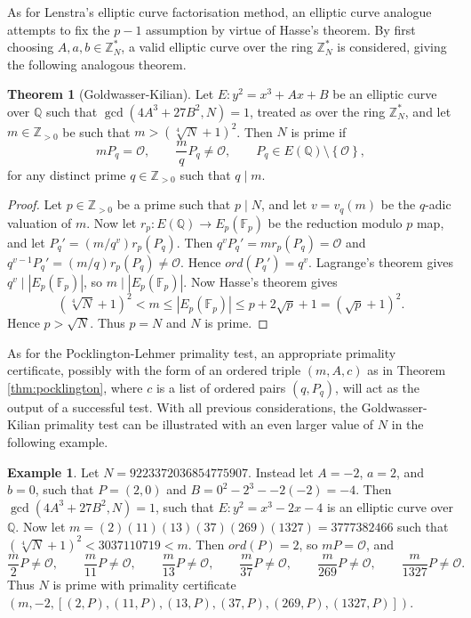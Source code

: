 \documentclass{article}
\newcommand{\F}{\mathbb{F}}
\newcommand{\Z}{\mathbb{Z}}
\newcommand{\Q}{\mathbb{Q}}
\newcommand{\rb}[1]{\left( #1 \right)}
\renewcommand{\sb}[1]{\left[ #1 \right]}
\newcommand{\cb}[1]{\left\{ #1 \right\}}
\newcommand{\abs}[1]{\left\lvert #1 \right\rvert}
\theoremstyle{definition}
\newtheorem*{example}{Example}
\newtheorem{theorem}[proposition]{Theorem}
\begin{document}
As for Lenstra's elliptic curve factorisation method, an elliptic curve analogue attempts to fix the $ p - 1 $ assumption by virtue of Hasse's theorem. By first choosing $ A, a, b \in \Z_N^* $, a valid elliptic curve over the ring $ \Z_N^* $ is considered, giving the following analogous theorem.

\begin{theorem}[Goldwasser-Kilian]
Let $ E : y^2 = x^3 + Ax + B $ be an elliptic curve over $ \Q $ such that $ \gcd\rb{4A^3 + 27B^2, N} = 1 $, treated as over the ring $ \Z_N^* $, and let $ m \in \Z_{> 0} $ be such that $ m > \rb{\sqrt[4]{N} + 1}^2 $. Then $ N $ is prime if
$$ mP_q = \mathcal{O}, \qquad \dfrac{m}{q}P_q \ne \mathcal{O}, \qquad P_q \in E\rb{\Q} \setminus \cb{\mathcal{O}}, $$
for any distinct prime $ q \in \Z_{> 0} $ such that $ q \mid m $.
\end{theorem}

\begin{proof}
Let $ p \in \Z_{> 0} $ be a prime such that $ p \mid N $, and let $ v = v_q\rb{m} $ be the $ q $-adic valuation of $ m $. Now let $ r_p : E\rb{\Q} \to E_p\rb{\F_p} $ be the reduction modulo $ p $ map, and let $ P_q' = \rb{m / q^v}r_p\rb{P_q} $. Then $ q^vP_q' = mr_p\rb{P_q} = \mathcal{O} $ and $ q^{v - 1}P_q' = \rb{m / q}r_p\rb{P_q} \ne \mathcal{O} $. Hence $ ord\rb{P_q'} = q^v $. Lagrange's theorem gives $ q^v \mid \abs{E_p\rb{\F_p}} $, so $ m \mid \abs{E_p\rb{\F_p}} $. Now Hasse's theorem gives
$$ \rb{\sqrt[4]{N} + 1}^2 < m \le \abs{E_p\rb{\F_p}} \le p + 2\sqrt{p} + 1 = \rb{\sqrt{p} + 1}^2. $$
Hence $ p > \sqrt{N} $. Thus $ p = N $ and $ N $ is prime.
\end{proof}

As for the Pocklington-Lehmer primality test, an appropriate primality certificate, possibly with the form of an ordered triple $ \rb{m, A, c} $ as in Theorem \ref{thm:pocklington}, where $ c $ is a list of ordered pairs $ \rb{q, P_q} $, will act as the output of a successful test. With all previous considerations, the Goldwasser-Kilian primality test can be illustrated with an even larger value of $ N $ in the following example.

\begin{example}
Let $ N = 9223372036854775907 $. Instead let $ A = -2 $, $ a = 2 $, and $ b = 0 $, such that $ P = \rb{2, 0} $ and $ B = 0^2 - 2^3 - -2\rb{-2} = -4 $. Then $ \gcd\rb{4A^3 + 27B^2, N} = 1 $, such that $ E : y^2 = x^3 - 2x - 4 $ is an elliptic curve over $ \Q $. Now let $ m = \rb{2}\rb{11}\rb{13}\rb{37}\rb{269}\rb{1327} = 3777382466 $ such that $ \rb{\sqrt[4]{N} + 1}^2 < 3037110719 < m $. Then $ ord\rb{P} = 2 $, so $ mP = \mathcal{O} $, and
$$ \dfrac{m}{2}P \ne \mathcal{O}, \qquad \dfrac{m}{11}P \ne \mathcal{O}, \qquad \dfrac{m}{13}P \ne \mathcal{O}, \qquad \dfrac{m}{37}P \ne \mathcal{O}, \qquad \dfrac{m}{269}P \ne \mathcal{O}, \qquad \dfrac{m}{1327}P \ne \mathcal{O}. $$
Thus $ N $ is prime with primality certificate $ \rb{m, -2, \sb{\rb{2, P}, \rb{11, P}, \rb{13, P}, \rb{37, P}, \rb{269, P}, \rb{1327, P}}} $.
\end{example}
\end{document}
